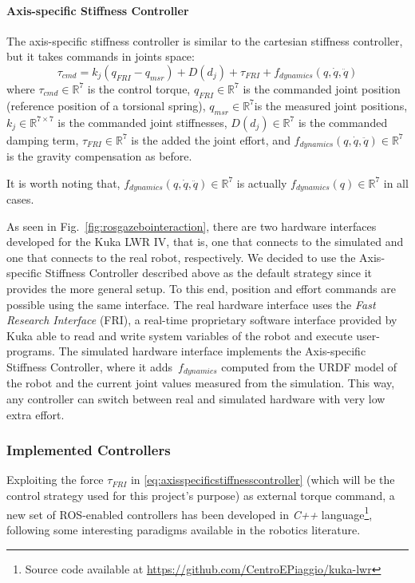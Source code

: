 \paragraph{Axis-specific Stiffness Controller}
The axis-specific stiffness controller is similar to the cartesian stiffness controller, but it takes commands in joints space:
\begin{equation}
\tau_{cmd} = k_j(q_{FRI} - q_{msr}) + D(d_j) + \tau_{FRI} + f_{dynamics}(q,\dot{q},\ddot{q})
\label{eq:axisspecificstiffnesscontroller}
\end{equation}
where $\tau_{cmd}\in \mathbb{R}^7$ is the control torque, $q_{FRI}\in\mathbb{R}^7$ is the commanded joint position (reference position of a torsional spring), $q_{msr}\in\mathbb{R}^7$is the measured joint positions, $k_j\in\mathbb{R}^{7\times 7}$ is the commanded joint stiffnesses, $D(d_j)\in\mathbb{R}^7$ is the commanded damping term, $\tau_{FRI}\in\mathbb{R}^7$ is the added the joint effort, and $f_{dynamics}(q,\dot{q},\ddot{q})\in\mathbb{R}^7$ is the gravity compensation as before.

It is worth noting that, $f_{dynamics}(q,\dot{q},\ddot{q})\in\mathbb{R}^7$ is actually $f_{dynamics}(q)\in\mathbb{R}^7$ in all cases.

As seen in Fig.~\ref{fig:rosgazebointeraction}, there are two hardware interfaces developed for the Kuka LWR IV, that is, one that connects to the simulated and one that connects to the real robot, respectively. We decided to use the Axis-specific Stiffness Controller described above as the default strategy since it provides the more general setup. To this end, position and effort commands are possible using the same interface. The real hardware interface uses the \textit{Fast Research Interface} (FRI), a real-time proprietary software interface provided by Kuka able to read and write system variables of the robot and execute user-programs. The simulated hardware interface implements the Axis-specific Stiffness Controller, where it adds~$f_{dynamics}$ computed from the URDF model of the robot and the current joint values measured from the simulation. This way, any controller can switch between real and simulated hardware with very low extra effort.

\subsubsection{Implemented Controllers}\nocite{siciliano09}\nocite{bicchi13}
Exploiting the force $\tau_{FRI}$ in \eqref{eq:axisspecificstiffnesscontroller} (which will be the control strategy used for this project's purpose) as external torque command, a new set of ROS-enabled controllers has been developed in \textit{C++} language\footnote{Source code available at \url{https://github.com/CentroEPiaggio/kuka-lwr}}, following some interesting paradigms available in the robotics literature.

